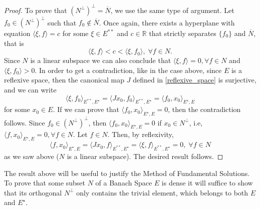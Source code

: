 \begin{proof}
    To prove that \((N^\perp)^\perp = \overline{N}\), we use the same type of argument. Let \(f_0 \in (N^\perp)^\perp\) such that \(f_0 \not \in \overline{N}\). Once again, there exists a hyperplane with equation \(\langle \xi, f \rangle = c\) for some \(\xi \in E^{**}\) and \(c \in \mathbb{R}\) that strictly separates \(\{f_0\}\) and \(\overline{N}\), that is
    \[
        \langle \xi, f \rangle < c < \langle \xi, f_0 \rangle, \; \forall f \in N.
    \]
    Since \(N\) is a linear subspace we can also conclude that \(\langle \xi, f \rangle = 0, \forall f \in N\) and \(\langle \xi, f_0 \rangle > 0\). In order to get a contradiction, like in the case above, since \(E\) is a reflexive space, then the canonical map \(J\) defined in \eqref{reflexive_space} is surjective, and we can write
    \[
        \langle \xi, f_0 \rangle_{E^{**}, E^\star} = \langle J x_0, f_0 \rangle_{E^{**}, E^\star} = \langle f_0, x_0 \rangle_{E^\star, E}
    \]
    for some \(x_0 \in E\). If we can prove that \(\langle f_0, x_0 \rangle_{E^\star, E} = 0\), then the contradiction follows. Since \(f_0 \in (N^\perp)^\perp\), then \(\langle f_0, x_0 \rangle_{E^\star, E} = 0\) if \(x_0 \in N^\perp\), i.e, \(\langle f, x_0 \rangle_{E^\star, E} = 0, \forall f \in N\). Let \(f \in N\). Then, by reflexivity,
    \[
        \langle f, x_0 \rangle_{E^\star, E} = \langle J x_0, f \rangle_{E^{**}, E^\star} = \langle \xi, f \rangle_{E^{**}, E^\star} = 0, \; \forall f \in N
    \]
    as we saw above (\(N\) is a linear subspace).
    The desired result follows.
\end{proof}
\begin{remark}
    The result above will be useful to justify the Method of Fundamental Solutions. To prove that some subset \(N\) of a Banach Space \(E\) is dense it will suffice to show that its orthogonal \(N^\perp\) only contains the trivial element, which belongs to both \(E\) and \(E^\star\).
\end{remark}


